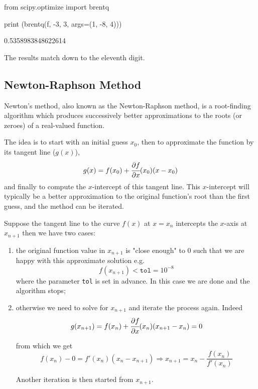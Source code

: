 \begin{ipythonnon}
from scipy.optimize import brentq
    
print (brentq(f, -3, 3, args=(1, -8, 4)))
\end{ipythonnon}
\begin{ioutput}
0.5358983848622614
\end{ioutput}

\noindent
The results match down to the eleventh digit.

\subsection{Newton-Raphson Method}

Newton's method, also known as the Newton-Raphson method, is a root-finding algorithm which produces successively better approximations to the roots (or zeroes) 
of a real-valued function. 

The idea is to start with an initial guess $x_0$, then to approximate the function by its tangent line ($g(x)$), 
\begin{equation*}
g(x) = f(x_0) + \cfrac{\partial f}{\partial x}(x_0)(x - x_0)
\end{equation*}
and finally to compute the $x$-intercept of this tangent line. This $x$-intercept will typically be a better approximation to the original function's root 
than the first guess, and the method can be iterated.

Suppose the tangent line to the curve $f(x)$ at $x = x_n$ intercepts the $x$-axis at $x_{n+1}$ then we have two cases:
\begin{enumerate}
\item the original function value in $x_{n+1}$ is "close enough" to 0 such that we are happy with this approximate solution e.g.
\begin{equation*}
f(x_{n+1}) < \texttt{tol}=10^{-8}
\end{equation*}
where the parameter \texttt{tol} is set in advance. In this case we are done and the algorithm stops;
\item otherwise we need to solve for $x_{n+1}$ and iterate the process again. Indeed 
\begin{equation*}
g(x_{n+1}) = f(x_n) + \cfrac{\partial f}{\partial x}(x_n)(x_{n+1} - x_n) = 0
\end{equation*}

from which we get
\begin{equation*}
f(x_{n})-0 = f'(x_n)(x_{n}-x_{n+1}) \Rightarrow x_{n+1}=x_n-\frac {f(x_n)}{f'(x_n)}
\end{equation*}

Another iteration is then started from $x_{n+1}$.
\end{enumerate}

